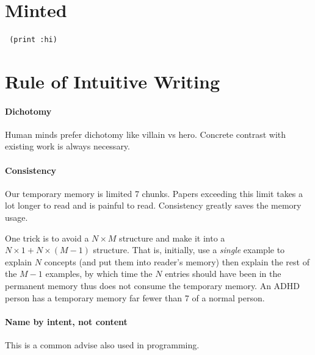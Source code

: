 \heuristicusage{}






\section{Minted}

\begin{verbatim}
 (print :hi)
\end{verbatim}

\section{Rule of Intuitive Writing}

\paragraph{Dichotomy}

Human minds prefer dichotomy like villain vs hero.
Concrete contrast with existing work is always necessary.

\paragraph{Consistency}

Our temporary memory is limited 7 chunks.
Papers exceeding this limit takes a lot longer to read and is painful to read.
Consistency greatly saves the memory usage.

One trick is to avoid a $N\times M$ structure and make it into a $N \times 1 + N \times (M-1)$ structure.
That is, initially, use a \emph{single} example to explain $N$ concepts (and put them into reader's memory)
then explain the rest of the $M-1$ examples, by which time the $N$ entries should have been in the permanent memory
thus does not consume the temporary memory.
An ADHD person has a temporary memory far fewer than 7 of a normal person.


\paragraph{Name by intent, not content}

This is a common advise also used in programming.

